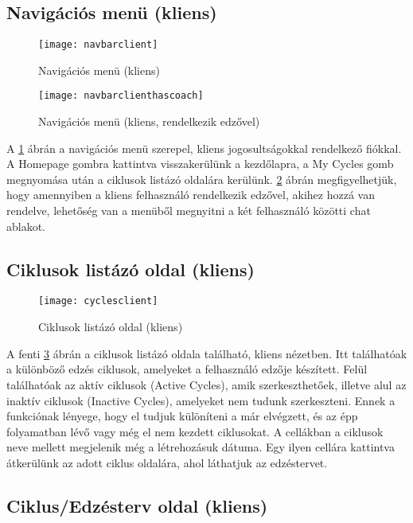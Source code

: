 \subsection{Navigációs menü (kliens)}

\begin{figure}[H]
	\centering
	\texttt{[image: navbarclient]}
	\caption{Navigációs menü (kliens)}
	\label{fig:navbarclient}
\end{figure}

\begin{figure}[H]
	\centering
	\texttt{[image: navbarclienthascoach]}
	\caption{Navigációs menü (kliens, rendelkezik edzővel)}
	\label{fig:navbarclienthascoach}
\end{figure}

A \ref{fig:navbarclient} ábrán a navigációs menü szerepel, kliens jogosultságokkal rendelkező fiókkal. A Homepage gombra kattintva visszakerülünk a kezdőlapra, a My Cycles gomb megnyomása után a ciklusok listázó oldalára kerülünk. \ref{fig:navbarclienthascoach} ábrán megfigyelhetjük, hogy amennyiben a kliens felhasználó rendelkezik edzővel, akihez hozzá van rendelve, lehetőség van a menüből megnyitni a két felhasználó közötti chat ablakot.

\subsection{Ciklusok listázó oldal (kliens)}

\begin{figure}[H]
	\centering
	\texttt{[image: cyclesclient]}
	\caption{Ciklusok listázó oldal (kliens)}
	\label{fig:cyclesclient}
\end{figure}

A fenti \ref{fig:cyclesclient} ábrán a ciklusok listázó oldala található, kliens nézetben. Itt találhatóak a különböző edzés ciklusok, amelyeket a felhasználó edzője készített. Felül találhatóak az aktív ciklusok (Active Cycles), amik szerkeszthetőek, illetve alul az inaktív ciklusok (Inactive Cycles), amelyeket nem tudunk szerkeszteni. Ennek a funkciónak lényege, hogy el tudjuk különíteni a már elvégzett, és az épp folyamatban lévő vagy még el nem kezdett ciklusokat. A cellákban a ciklusok neve mellett megjelenik még a létrehozásuk dátuma. Egy ilyen cellára kattintva átkerülünk az adott ciklus oldalára, ahol láthatjuk az edzéstervet.

\subsection{Ciklus/Edzésterv oldal (kliens)}

